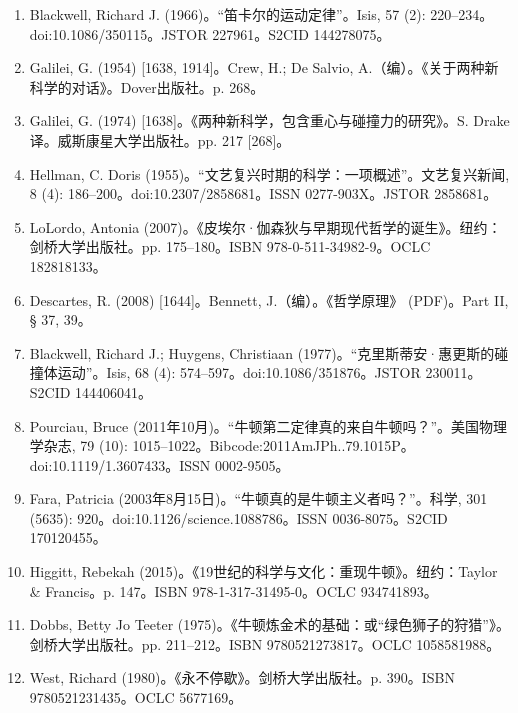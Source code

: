\begin{enumerate}
(2).Robertson, Amy D.; Goodhew, Lisa M.; Scherr, Rachel E.; Heron, Paula R. L. (2021年3月)。“与牛顿物理学相连续的冲力式推理”。物理教师，59 (3): 185–188。doi:10.1119/10.0003660。ISSN 0031-921X。S2CID 233803836。\\
(3)Robertson, Amy D.; Goodhew, Lisa M.; Scherr, Rachel E.; Heron, Paula R. L. (2021年3月30日)。“大学生理解力的概念资源”*。物理评论物理教育研究，17 (1): 010121。Bibcode:2021PRPER..17a0121R。doi:10.1103/PhysRevPhysEducRes.17.010121。ISSN 2469-9896。S2CID 243143427。
\item Blackwell, Richard J. (1966)。“笛卡尔的运动定律”。Isis, 57 (2): 220–234。doi:10.1086/350115。JSTOR 227961。S2CID 144278075。
\item Galilei, G. (1954) [1638, 1914]。Crew, H.; De Salvio, A.（编）。《关于两种新科学的对话》。Dover出版社。p. 268。
\item Galilei, G. (1974) [1638]。《两种新科学，包含重心与碰撞力的研究》。S. Drake译。威斯康星大学出版社。pp. 217 [268]。
\item Hellman, C. Doris (1955)。“文艺复兴时期的科学：一项概述”。文艺复兴新闻, 8 (4): 186–200。doi:10.2307/2858681。ISSN 0277-903X。JSTOR 2858681。
\item LoLordo, Antonia (2007)。《皮埃尔·伽森狄与早期现代哲学的诞生》。纽约：剑桥大学出版社。pp. 175–180。ISBN 978-0-511-34982-9。OCLC 182818133。
\item Descartes, R. (2008) [1644]。Bennett, J.（编）。《哲学原理》 (PDF)。Part II, § 37, 39。
\item Blackwell, Richard J.; Huygens, Christiaan (1977)。“克里斯蒂安·惠更斯的碰撞体运动”。Isis, 68 (4): 574–597。doi:10.1086/351876。JSTOR 230011。S2CID 144406041。
\item Pourciau, Bruce (2011年10月)。“牛顿第二定律真的来自牛顿吗？”。美国物理学杂志, 79 (10): 1015–1022。Bibcode:2011AmJPh..79.1015P。doi:10.1119/1.3607433。ISSN 0002-9505。
\item Fara, Patricia (2003年8月15日)。“牛顿真的是牛顿主义者吗？”。科学, 301 (5635): 920。doi:10.1126/science.1088786。ISSN 0036-8075。S2CID 170120455。
\item Higgitt, Rebekah (2015)。《19世纪的科学与文化：重现牛顿》。纽约：Taylor & Francis。p. 147。ISBN 978-1-317-31495-0。OCLC 934741893。
\item Dobbs, Betty Jo Teeter (1975)。《牛顿炼金术的基础：或“绿色狮子的狩猎”》。剑桥大学出版社。pp. 211–212。ISBN 9780521273817。OCLC 1058581988。
\item West, Richard (1980)。《永不停歇》。剑桥大学出版社。p. 390。ISBN 9780521231435。OCLC 5677169。

\end{enumerate}
